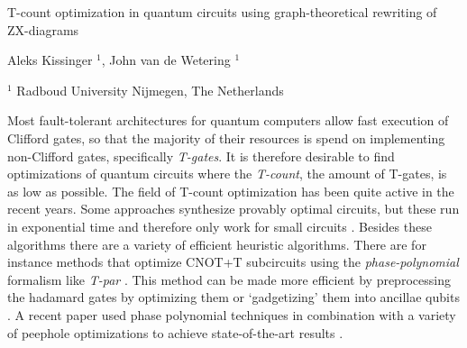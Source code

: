 \documentclass[a4paper,11pt]{article}
\begin{document}

\Large
 \begin{center}
T-count optimization in quantum circuits using graph-theoretical rewriting of ZX-diagrams\\ 

\hspace{10pt}

\normalsize
Aleks Kissinger $^1$, John van de Wetering $^1$ \\

\hspace{10pt}

\small  
$^1$ Radboud University Nijmegen, The Netherlands


\end{center}

\hspace{10pt}

\normalsize

\noindent

Most fault-tolerant architectures for quantum computers allow fast execution of Clifford gates, so that the majority of their resources is spend on implementing non-Clifford gates, specifically \emph{T-gates}. It is therefore desirable to find optimizations of quantum circuits where the \emph{T-count}, the amount of T-gates, is as low as possible. The field of T-count optimization has been quite active in the recent years. Some approaches synthesize provably optimal circuits, but these run in exponential time and therefore only work for small circuits \cite{di2016parallelizing}. Besides these algorithms there are a variety of efficient heuristic algorithms. There are for instance methods that optimize CNOT+T subcircuits using the \emph{phase-polynomial} formalism like \emph{T-par} \cite{amy2014polynomial}. This method can be made more efficient by preprocessing the hadamard gates by optimizing them \cite{abdessaied2014quantum} or `gadgetizing' them into ancillae qubits \cite{heyfron2018efficient}. A recent paper used phase polynomial techniques in combination with a variety of peephole optimizations to achieve state-of-the-art results \cite{nam2018automated}.
\end{document}
